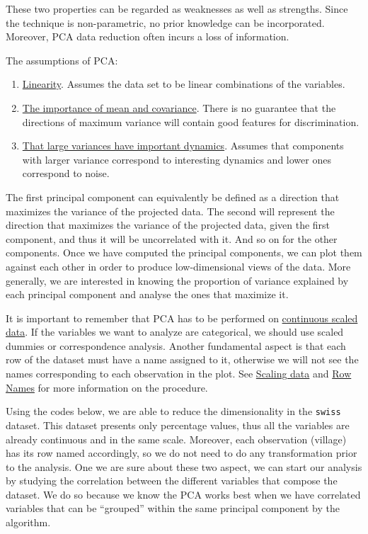 \documentclass[
]{article}
\providecommand{\tightlist}{%
  \setlength{\itemsep}{0pt}\setlength{\parskip}{0pt}}
\begin{document}
These two properties can be regarded as weaknesses as well as strengths.
Since the technique is non-parametric, no prior knowledge can be
incorporated. Moreover, PCA data reduction often incurs a loss of
information.

The assumptions of PCA:

\begin{enumerate}
\def\labelenumi{\arabic{enumi}.}
\tightlist
\item
  \ul{Linearity}. Assumes the data set to be linear
  combinations of the variables.
\item
  \ul{The importance of mean and covariance}. There is no
  guarantee that the directions of maximum variance will contain good
  features for discrimination.
\item
  \ul{That large variances have important dynamics}. Assumes
  that components with larger variance correspond to interesting
  dynamics and lower ones correspond to noise.
\end{enumerate}

The first principal component can equivalently be defined as a direction
that maximizes the variance of the projected data. The second will
represent the direction that maximizes the variance of the projected
data, given the first component, and thus it will be uncorrelated with
it. And so on for the other components. Once we have computed the
principal components, we can plot them against each other in order to
produce low-dimensional views of the data. More generally, we are
interested in knowing the proportion of variance explained by each
principal component and analyse the ones that maximize it.

It is important to remember that PCA has to be performed on \ul{continuous
scaled data}. If the variables we want to analyze are
categorical, we should use scaled dummies or correspondence analysis.
Another fundamental aspect is that each row of the dataset must have a
name assigned to it, otherwise we will not see the names corresponding
to each observation in the plot. See \protect\hyperlink{scaling-data}{Scaling data} and \protect\hyperlink{row-names}{Row Names} for
more information on the procedure.

Using the codes below, we are able to reduce the dimensionality in the
\texttt{swiss} dataset. This dataset presents only percentage values, thus all
the variables are already continuous and in the same scale. Moreover,
each observation (village) has its row named accordingly, so we do not
need to do any transformation prior to the analysis. One we are sure
about these two aspect, we can start our analysis by studying the
correlation between the different variables that compose the dataset. We
do so because we know the PCA works best when we have correlated
variables that can be ``grouped'' within the same principal component by
the algorithm.
\end{document}
